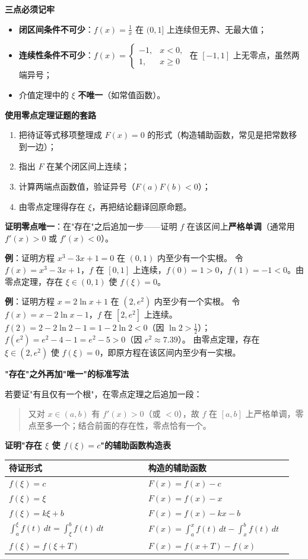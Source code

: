 \documentclass[11pt,openany,UTF8]{ctexbook}
\begin{document}
\textbf{三点必须记牢}

\begin{itemize}
\item \textbf{闭区间条件不可少}：$f(x)=\frac1x$ 在 $(0,1]$ 上连续但无界、无最大值；
\item \textbf{连续性条件不可少}：$f(x)=\begin{cases}-1, & x<0,\\ 1, & x\ge 0\end{cases}$ 在 $[-1,1]$ 上无零点，虽然两端异号；
\item 介值定理中的 $\xi$ \textbf{不唯一}（如常值函数）。
\end{itemize}
\textbf{使用零点定理证题的套路}

\begin{enumerate}
\item 把待证等式移项整理成 $F(x)=0$ 的形式（构造辅助函数，常见是把常数移到一边）；
\item 指出 $F$ 在某个闭区间上连续；
\item 计算两端点函数值，验证异号（$F(a)F(b)<0$）；
\item 由零点定理得存在 $\xi$，再把结论翻译回原命题。
\end{enumerate}
\textbf{证明零点唯一}：在"存在"之后追加一步——证明 $f$ 在该区间上\textbf{严格单调}（通常用 $f'(x)>0$ 或 $f'(x)<0$）。

\textbf{例}：证明方程 $x^{3}-3x+1=0$ 在 $(0,1)$ 内至少有一个实根。 令 $f(x)=x^{3}-3x+1$，$f$ 在 $[0,1]$ 上连续，$f(0)=1>0$，$f(1)=-1<0$。由零点定理，存在 $\xi\in(0,1)$ 使 $f(\xi)=0$。

\textbf{例}：证明方程 $x=2\ln x+1$ 在 $(2,e^{2})$ 内至少有一个实根。 令 $f(x)=x-2\ln x-1$，$f$ 在 $[2,e^{2}]$ 上连续。 $f(2)=2-2\ln 2-1=1-2\ln 2<0$（因 $\ln 2>\frac12$）；$f(e^{2})=e^{2}-4-1=e^{2}-5>0$（因 $e^{2}\approx 7.39$）。 由零点定理，存在 $\xi\in(2,e^{2})$ 使 $f(\xi)=0$，即原方程在该区间内至少有一实根。

\textbf{"存在"之外再加"唯一"的标准写法}

若要证"有且仅有一个根"，在零点定理之后追加一段：

\begin{quote}
又对 $x\in(a,b)$ 有 $f'(x)>0$（或 $<0$），故 $f$ 在 $[a,b]$ 上严格单调，零点至多一个；结合前面的存在性，零点恰有一个。

\end{quote}
\textbf{证明"存在 $\xi$ 使 $f(\xi)=c$"的辅助函数构造表}

\begingroup\small\setlength{\tabcolsep}{4.0pt}
\begin{longtable}{@{}L{0.4728\linewidth}L{0.4728\linewidth}@{}}
\toprule
\textbf{待证形式} & \textbf{构造的辅助函数} \\
\midrule
\endhead
$f(\xi)=c$ & $F(x)=f(x)-c$ \\
$f(\xi)=\xi$ & $F(x)=f(x)-x$ \\
$f(\xi)=k\xi+b$ & $F(x)=f(x)-kx-b$ \\
$\int_a^{\xi}f(t)\,dt=\int_{\xi}^{b}f(t)\,dt$ & $F(x)=\int_a^{x}f(t)\,dt-\int_x^{b}f(t)\,dt$ \\
$f(\xi)=f(\xi+T)$ & $F(x)=f(x+T)-f(x)$ \\
\bottomrule
\end{longtable}
\endgroup
\end{document}
